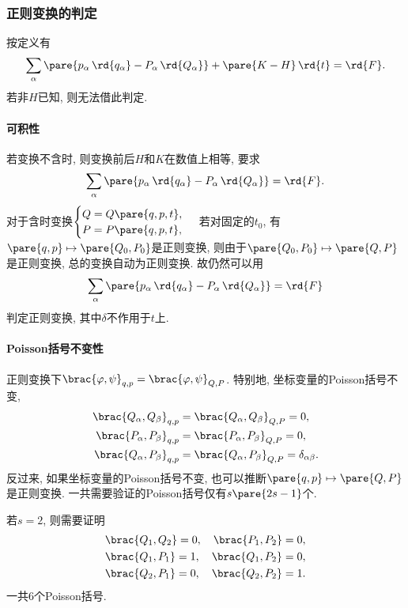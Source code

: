 \documentclass{ctexart}
\begin{document}

\subsubsection{正则变换的判定} %
\label{ssub:正则变换的判定}

按定义有
\[ \sum_\alpha \pare{p_\alpha\,\rd{q_\alpha} - P_\alpha\,\rd{Q_\alpha}} + \pare{K-H}\,\rd{t} = \rd{F}. \]
若非$H$已知, 则无法借此判定.

\paragraph{可积性} %
\label{par:可积性}

若变换不含时, 则变换前后$H$和$K$在数值上相等, 要求
\[ \sum_\alpha \pare{p_\alpha\,\rd{q_\alpha} - P_\alpha\,\rd{Q_\alpha}} = \rd{F}. \]
对于含时变换$\begin{cases}
    Q = Q\pare{q,p,t}, \\
    P = P\pare{q,p,t},
\end{cases}$ 若对固定的$t_0$, 有$\pare{q,p}\mapsto \pare{Q_0,P_0}$是正则变换, 则由于$\pare{Q_0,P_0}\mapsto \pare{Q,P}$是正则变换, 总的变换自动为正则变换. 故仍然可以用
\[ \sum_\alpha \pare{p_\alpha\,\rd{q_\alpha} - P_\alpha\,\rd{Q_\alpha}} = \rd{F} \]
判定正则变换, 其中$\delta$不作用于$t$上.


\paragraph{Poisson括号不变性} %
\label{par:poisson括号不变性}

正则变换下$\brac{\varphi,\psi}_{q,p} = \brac{\varphi,\psi}_{Q,P}$. 特别地, 坐标变量的Poisson括号不变,
\begin{align*}
    \brac{Q_\alpha,Q_\beta}_{q,p} &= \brac{Q_\alpha,Q_\beta}_{Q,P} = 0, \\
    \brac{P_\alpha,P_\beta}_{q,p} &= \brac{P_\alpha,P_\beta}_{Q,P} = 0, \\
    \brac{Q_\alpha,P_\beta}_{q,p} &= \brac{Q_\alpha,P_\beta}_{Q,P} = \delta_{\alpha\beta}.
\end{align*}
反过来, 如果坐标变量的Poisson括号不变, 也可以推断$\pare{q,p}\mapsto\pare{Q,P}$是正则变换. 一共需要验证的Poisson括号仅有$s\pare{2s-1}$个.
\begin{ex}
    若$s=2$, 则需要证明
    \begin{align*}
        \brac{Q_1,Q_2} = 0,\quad \brac{P_1,P_2} = 0, \\
        \brac{Q_1,P_1} = 1,\quad \brac{Q_1,P_2} = 0, \\
        \brac{Q_2,P_1} = 0,\quad \brac{Q_2,P_2} = 1.
    \end{align*}
    一共$6$个Poisson括号.
\end{ex}
\end{document}
